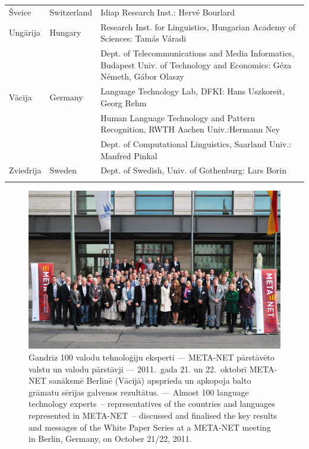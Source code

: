 \begin{longtable}{@{}llp{113mm}@{}}
  Šveice & \textcolor{grey1}{Switzerland} & Idiap Research Inst.: Hervé Bourlard \\ \addlinespace 
  Ungārija & \textcolor{grey1}{Hungary} & Research Inst. for Linguistics, Hungarian Academy of Sciences: Tamás Váradi\\  \addlinespace
  & & Dept. of Telecommunications and Media Informatics, Budapest Univ. of Technology and Economics: Géza Németh, Gábor Olaszy\\ \addlinespace
  Vācija & \textcolor{grey1}{Germany} & Language Technology Lab, DFKI: Hans Uszkoreit, Georg Rehm\\ \addlinespace
  & & Human Language Technology and Pattern Recognition, RWTH Aachen Univ.:\newline Hermann Ney \\ \addlinespace
  & & Dept. of Computational Linguistics, Saarland Univ.: Manfred Pinkal\\ \addlinespace 
  Zviedrija & \textcolor{grey1}{Sweden} & Dept. of Swedish, Univ. of Gothenburg: Lars Borin \\ \addlinespace
  \end{longtable}
\normalsize

\renewcommand*{\figureformat}{}
\renewcommand*{\captionformat}{}

\makeatletter
\def\@makecaption#1#2{%
  \vskip\abovecaptionskip%
  \raggedright%
  \textsf{#1#2}\hfil%
  \vskip\belowcaptionskip
}
\makeatother

\begin{figure}[htbp]
  \center
    \includegraphics[width=\textwidth]{../_media/meta-net_team_ebook.jpg}
  \caption{\noindent%
  Gandrīz 100 valodu tehnoloģiju eksperti --- META-NET pārstāvēto valstu un valodu pārstāvji --- 2011.~gada 21. un 22.~oktobrī META-NET sanāksmē Berlīnē (Vācijā) apsprieda un apkopoja balto grāmatu sērijas galvenos rezultātus. --- \textcolor{grey1}{Almost 100 language technology experts~-- representatives of the countries and languages represented in META-NET~-- discussed and finalised the key results and messages of the White Paper Series at a META-NET meeting in Berlin, Germany, on October 21/22, 2011.}}
  \medskip
\end{figure}

